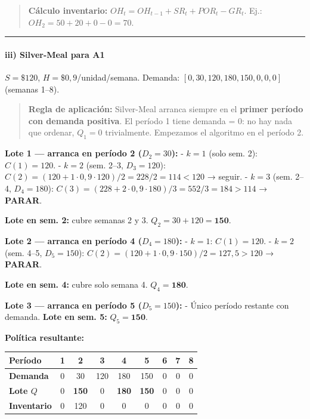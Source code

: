 \documentclass[
]{article}
\begin{document}
\begin{quote}
\textbf{Cálculo inventario:} \(OH_t = OH_{t-1} + SR_t + POR_t - GR_t\).
Ej.: \(OH_2 = 50 + 20 + 0 - 0 = 70\).
\end{quote}

\begin{center}\rule{0.5\linewidth}{0.5pt}\end{center}

\hypertarget{iii-silver-meal-para-a1}{%
\paragraph{iii) Silver-Meal para A1}\label{iii-silver-meal-para-a1}}

\(S = \$120\), \(H = \$0{,}9\)/unidad/semana. Demanda:
\([0, 30, 120, 180, 150, 0, 0, 0]\) (semanas 1--8).

\begin{quote}
\textbf{Regla de aplicación:} Silver-Meal arranca siempre en el
\textbf{primer período con demanda positiva}. El período 1 tiene demanda
= 0: no hay nada que ordenar, \(Q_1 = 0\) trivialmente. Empezamos el
algoritmo en el período 2.
\end{quote}

\textbf{Lote 1 --- arranca en período 2 (\(D_2 = 30\)):} - \(k=1\) (solo
sem. 2): \(C(1) = 120\). - \(k=2\) (sem. 2--3, \(D_3 = 120\)):
\(C(2) = (120 + 1 \cdot 0{,}9 \cdot 120)/2 = 228/2 = 114 < 120\) →
seguir. - \(k=3\) (sem. 2--4, \(D_4 = 180\)):
\(C(3) = (228 + 2 \cdot 0{,}9 \cdot 180)/3 = 552/3 = 184 > 114\) →
\textbf{PARAR}.

\textbf{Lote en sem. 2:} cubre semanas 2 y 3.
\(Q_2 = 30 + 120 = \mathbf{150}\).

\textbf{Lote 2 --- arranca en período 4 (\(D_4 = 180\)):} - \(k=1\):
\(C(1) = 120\). - \(k=2\) (sem. 4--5, \(D_5 = 150\)):
\(C(2) = (120 + 1 \cdot 0{,}9 \cdot 150)/2 = 127{,}5 > 120\) →
\textbf{PARAR}.

\textbf{Lote en sem. 4:} cubre solo semana 4. \(Q_4 = \mathbf{180}\).

\textbf{Lote 3 --- arranca en período 5 (\(D_5 = 150\)):} - Único
período restante con demanda. \textbf{Lote en sem. 5:}
\(Q_5 = \mathbf{150}\).

\textbf{Política resultante:}

\begin{longtable}[]{@{}lcccccccc@{}}
\toprule\noalign{}
Período & 1 & 2 & 3 & 4 & 5 & 6 & 7 & 8 \\
\midrule\noalign{}
\endhead
\bottomrule\noalign{}
\endlastfoot
\textbf{Demanda} & 0 & 30 & 120 & 180 & 150 & 0 & 0 & 0 \\
\textbf{Lote \(Q\)} & 0 & \textbf{150} & 0 & \textbf{180} & \textbf{150}
& 0 & 0 & 0 \\
\textbf{Inventario} & 0 & 120 & 0 & 0 & 0 & 0 & 0 & 0 \\
\end{longtable}
\end{document}
